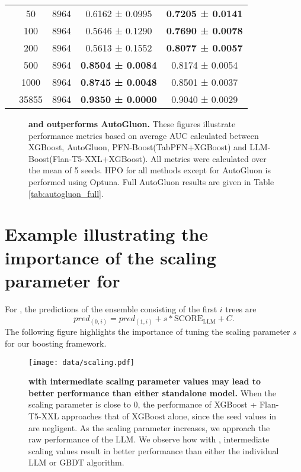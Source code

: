 \begin{table}[H]
{\begin{tabular}[H]{@{}lcccc@{}}
                              & 50          & 8964 & 0.6162 ± 0.0995          & \textbf{0.7205 ± 0.0141} \\
                              & 100         & 8964 & 0.5646 ± 0.1290          & \textbf{0.7690 ± 0.0078} \\
                              & 200         & 8964 & 0.5613 ± 0.1552          & \textbf{0.8077 ± 0.0057} \\
                              & 500         & 8964 & \textbf{0.8504 ± 0.0084} & 0.8174 ± 0.0054          \\
                              & 1000        & 8964 & \textbf{0.8745 ± 0.0048} & 0.8501 ± 0.0037          \\
                              & 35855       & 8964 & \textbf{0.9350 ± 0.0000} & 0.9040 ± 0.0029       \\  
\bottomrule
\end{tabular}}
\end{table}


\begin{figure}[H]
    \centering
    \qquad
    \qquad
    \caption{\textbf{\methodname and \methodnamepfn outperforms AutoGluon.} These figures illustrate performance metrics based on average AUC calculated between XGBoost, AutoGluon, PFN-Boost(TabPFN+XGBoost) and LLM-Boost(Flan-T5-XXL+XGBoost). All metrics were calculated over the mean of 5 seeds. HPO for all methods except for AutoGluon is performed using Optuna. Full AutoGluon results are given in Table \ref{tab:autogluon_full}.}%
    \label{fig:autogluon}
\end{figure}

\section{Example illustrating the importance of the scaling parameter for \methodname}
\label{scaling}
For \methodname, the predictions of the ensemble consisting of the first $i$ trees are
\[ pred_{(0,i)} = pred_{(1,i)} + s*\text{SCORE}_{\text{LLM}} + C.\]
The following figure highlights the importance of tuning the scaling parameter $s$ for our boosting framework.
\begin{figure}[H]
    \centering
    {{\texttt{[image: data/scaling.pdf]}}}%
    \caption{\textbf{\methodname with intermediate scaling parameter values may lead to better performance than either standalone model.}
    When the scaling parameter is close to 0, the performance of XGBoost + Flan-T5-XXL approaches that of XGBoost alone, since the seed values in \methodname are negligent. As the scaling parameter increases, we approach the raw performance of the LLM. 
    We observe how with \methodname, intermediate scaling values result in better performance than either the individual LLM or GBDT algorithm.}%
    \label{fig:graphs}%
\end{figure}



